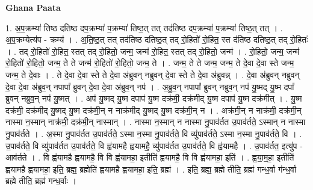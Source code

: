 \documentclass[17pt]{extarticle}
\begin{document}
\textbf{Ghana Paata } \newline

1. अ॒प॒क्रम्या॑ तिष्ठ दतिष्ठ दप॒क्रम्या॑ प॒क्रम्या॑ तिष्ठ॒त् तत् तद॑तिष्ठ दप॒क्रम्या॑ प॒क्रम्या॑ तिष्ठ॒त् तत् । . अ॒प॒क्रम्येत्य॑प - क्रम्य॑ । . अ॒ति॒ष्ठ॒त् तत् तद॑तिष्ठ दतिष्ठ॒त् तद् रो॒हितो॑ रो॒हित॒ स्त द॑तिष्ठ दतिष्ठ॒त् तद् रो॒हितः॑ । . तद् रो॒हितो॑ रो॒हित॒ स्तत् तद् रो॒हितो॒ जन्म॒ जन्म॑ रो॒हित॒ स्तत् तद् रो॒हितो॒ जन्म॑ । . रो॒हितो॒ जन्म॒ जन्म॑ रो॒हितो॑ रो॒हितो॒ जन्म॒ ते ते जन्म॑ रो॒हितो॑ रो॒हितो॒ जन्म॒ ते । . जन्म॒ ते ते जन्म॒ जन्म॒ ते दे॒वा दे॒वा स्ते जन्म॒ जन्म॒ ते दे॒वाः । . ते दे॒वा दे॒वा स्ते ते दे॒वा अ॑ब्रुवन् नब्रुवन् दे॒वा स्ते ते दे॒वा अ॑ब्रुवन्न् । . दे॒वा अ॑ब्रुवन् नब्रुवन् दे॒वा दे॒वा अ॑ब्रुव॒न् नपापा᳚ ब्रुवन् दे॒वा दे॒वा अ॑ब्रुव॒न् नप॑ । . अ॒ब्रु॒व॒न् नपापा᳚ ब्रुवन् नब्रुव॒न् नप॑ यु॒ष्मद् यु॒ष्म दपा᳚ ब्रुवन् नब्रुव॒न् नप॑ यु॒ष्मत् । . अप॑ यु॒ष्मद् यु॒ष्म दपाप॑ यु॒ष्म दक्र॑मी॒ दक्र॑मीद् यु॒ष्म दपाप॑ यु॒ष्म दक्र॑मीत् । . यु॒ष्म दक्र॑मी॒ दक्र॑मीद् यु॒ष्मद् यु॒ष्म दक्र॑मी॒न् न नाक्र॑मीद् यु॒ष्मद् यु॒ष्म दक्र॑मी॒न् न । . अक्र॑मी॒न् न नाक्र॑मी॒ दक्र॑मी॒न् नास्मा न॒स्मान् नाक्र॑मी॒ दक्र॑मी॒न् नास्मान् । . नास्मा न॒स्मान् न नास्मा नु॒पाव॑र्तत उ॒पाव॑र्तते॒ ऽस्मान् न नास्मा नु॒पाव॑र्तते । . अ॒स्मा नु॒पाव॑र्तत उ॒पाव॑र्तते॒ ऽस्मा न॒स्मा नु॒पाव॑र्तते॒ वि व्यु॑पाव॑र्तते॒ ऽस्मा न॒स्मा नु॒पाव॑र्तते॒ वि । . उ॒पाव॑र्तते॒ वि व्यु॑पाव॑र्तत उ॒पाव॑र्तते॒ वि ह्व॑यामहै ह्वयामहै॒ व्यु॑पाव॑र्तत उ॒पाव॑र्तते॒ वि ह्व॑यामहै । . उ॒पाव॑र्तत॒ इत्यु॑प - आव॑र्तते । . वि ह्व॑यामहै ह्वयामहै॒ वि वि ह्व॑यामहा॒ इतीति॑ ह्वयामहै॒ वि वि ह्व॑यामहा॒ इति॑ । . ह्व॒या॒म॒हा॒ इतीति॑ ह्वयामहै ह्वयामहा॒ इति॒ ब्रह्म॒ ब्रह्मेति॑ ह्वयामहै ह्वयामहा॒ इति॒ ब्रह्म॑ । . इति॒ ब्रह्म॒ ब्रह्मे तीति॒ ब्रह्म॑ गन्ध॒र्वा ग॑न्ध॒र्वा ब्रह्मे तीति॒ ब्रह्म॑ गन्ध॒र्वाः । \newline
\end{document}
